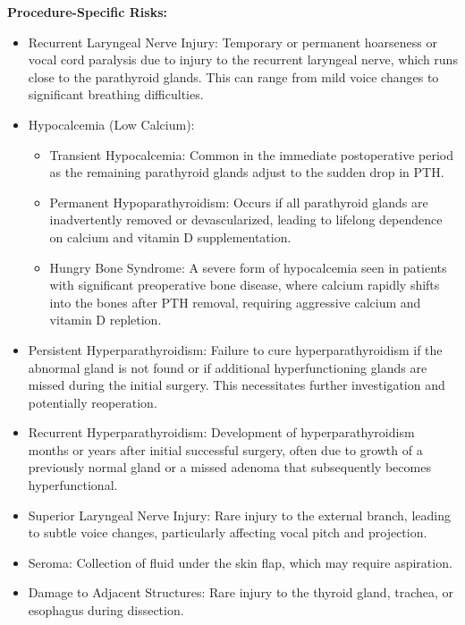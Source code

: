 \textbf{Procedure-Specific Risks:}
\begin{itemize}
  \item Recurrent Laryngeal Nerve Injury: Temporary or permanent hoarseness or vocal cord paralysis due to injury to the recurrent laryngeal nerve, which runs close to the parathyroid glands. This can range from mild voice changes to significant breathing difficulties.
  \item Hypocalcemia (Low Calcium):
    \begin{itemize}
      \item Transient Hypocalcemia: Common in the immediate postoperative period as the remaining parathyroid glands adjust to the sudden drop in PTH.
      \item Permanent Hypoparathyroidism: Occurs if all parathyroid glands are inadvertently removed or devascularized, leading to lifelong dependence on calcium and vitamin D supplementation.
      \item Hungry Bone Syndrome: A severe form of hypocalcemia seen in patients with significant preoperative bone disease, where calcium rapidly shifts into the bones after PTH removal, requiring aggressive calcium and vitamin D repletion.
    \end{itemize}
  \item Persistent Hyperparathyroidism: Failure to cure hyperparathyroidism if the abnormal gland is not found or if additional hyperfunctioning glands are missed during the initial surgery. This necessitates further investigation and potentially reoperation.
  \item Recurrent Hyperparathyroidism: Development of hyperparathyroidism months or years after initial successful surgery, often due to growth of a previously normal gland or a missed adenoma that subsequently becomes hyperfunctional.
  \item Superior Laryngeal Nerve Injury: Rare injury to the external branch, leading to subtle voice changes, particularly affecting vocal pitch and projection.
  \item Seroma: Collection of fluid under the skin flap, which may require aspiration.
  \item Damage to Adjacent Structures: Rare injury to the thyroid gland, trachea, or esophagus during dissection.
\end{itemize}

